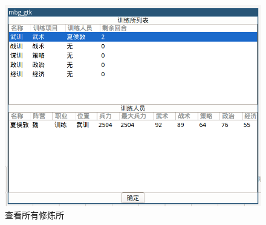 \documentclass[UTF8, zihao=-4]{ctexart} %
\begin{document}
\begin{figure}
    \centering
    \includegraphics[width=\textwidth]{f_train.png}
    \caption{\label{f_train}查看所有修炼所}
\end{figure}
\end{document}
